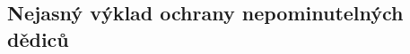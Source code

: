 \documentclass{article}
\begin{document}


\subsection{Nejasný výklad ochrany nepominutelných dědiců}

\end{document}
